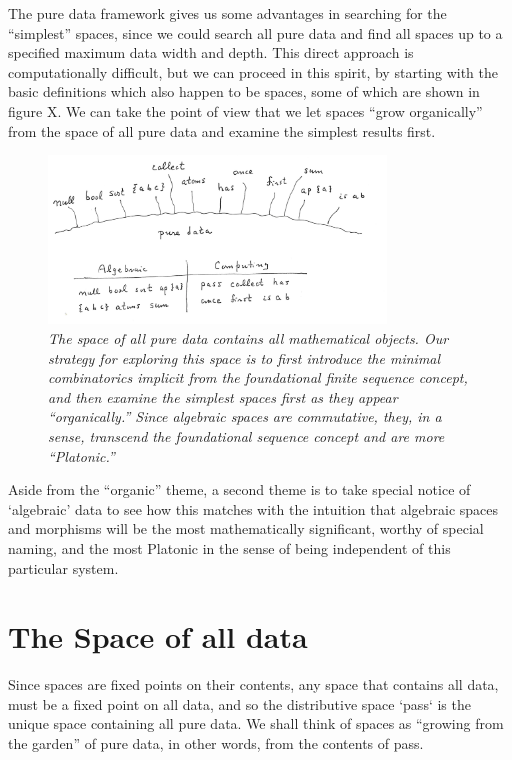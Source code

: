 \documentclass[11pt]{article}
\begin{document}
    The pure data framework gives us some advantages in searching for the ``simplest'' spaces, since we could search all pure data and find all spaces 
up to a specified maximum data width and depth.  This direct approach is computationally difficult, but we can proceed in this spirit, by starting with 
the basic definitions which also happen to be spaces, some of which are shown in figure X.   We can take the point of view that we let 
spaces ``grow organically'' from the space of all pure data and examine the simplest results first.  
\begin{figure}[h]
\centering
\includegraphics[width=0.8\textwidth]{garden1.png}
\caption{{\it The space of all pure data contains all mathematical objects.  Our strategy for exploring this space is to first introduce 
the minimal combinatorics implicit from the foundational finite sequence concept, and then examine the simplest spaces first as they 
appear ``organically.''  Since algebraic spaces are commutative, they, in a sense, transcend the foundational sequence concept and are more ``Platonic.''}}
\end{figure}
Aside from the ``organic'' theme, a second theme is to take special notice of `algebraic' data to see how this matches with the intuition that 
algebraic spaces and morphisms will be the most mathematically significant, worthy of special naming, and the most Platonic in the sense
of being independent of this particular system.  

\section{The Space of all data} 

     Since spaces are fixed points on their contents, any space that contains all data, must be a fixed point on all data, and so the distributive space `pass` is 
the unique space containing all pure data.  We shall think of spaces as ``growing from the garden'' of pure data, in other words, from the 
contents of pass. 
\end{document}
